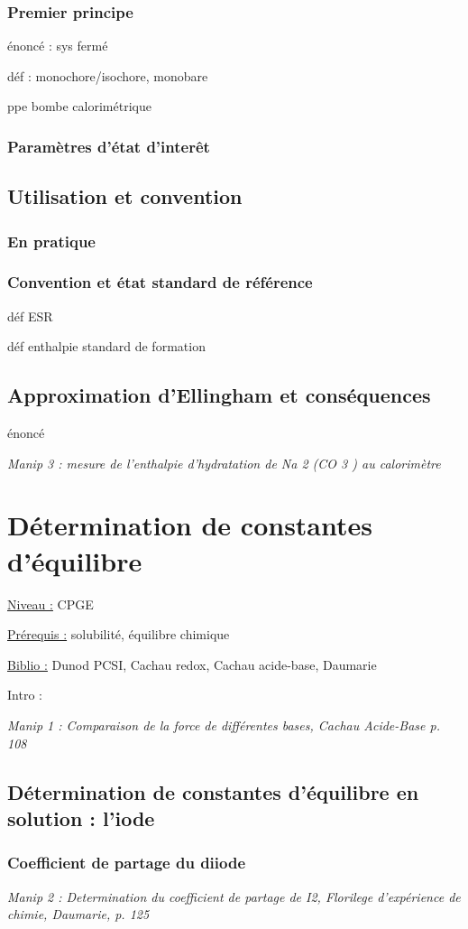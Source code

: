 \documentclass{article}%
\begin{document}
\subsubsection{Premier principe}
énoncé : sys fermé

déf : monochore/isochore, monobare

ppe bombe calorimétrique
\subsubsection{Paramètres d'état d'interêt}
\subsection{Utilisation et convention}
\subsubsection{En pratique}
\subsubsection{Convention et état standard de référence}
déf ESR

déf enthalpie standard de formation
\subsection{Approximation d'Ellingham et conséquences}
énoncé

\textit{Manip 3 : mesure de l’enthalpie d’hydratation de Na 2 (CO 3 ) au calorimètre}
\section{Détermination de constantes d'équilibre}
\underline{Niveau :} CPGE 

\underline{Prérequis :} solubilité, équilibre chimique

\underline{Biblio :} Dunod PCSI, Cachau redox, Cachau acide-base, Daumarie

Intro :

\textit{Manip 1 : Comparaison de la force de différentes bases, Cachau Acide-Base p. 108}

\subsection{Détermination de constantes d'équilibre en solution : l'iode}
\subsubsection{Coefficient de partage du diiode}
\textit{Manip 2 : Determination du coefficient de partage de I2, Florilege d’expérience de chimie, Daumarie, p. 125}
\end{document}
